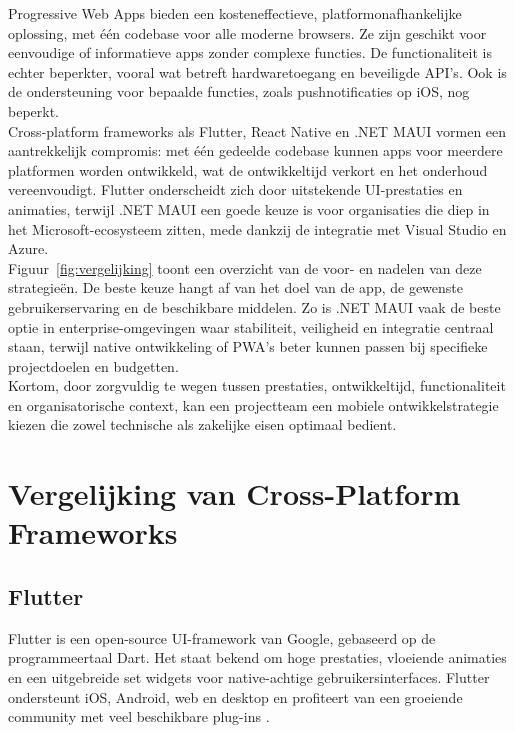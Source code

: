 Progressive Web Apps bieden een kosteneffectieve, platformonafhankelijke oplossing, met één codebase voor alle moderne browsers. Ze zijn geschikt voor eenvoudige of informatieve apps zonder complexe functies. De functionaliteit is echter beperkter, vooral wat betreft hardwaretoegang en beveiligde API’s. Ook is de ondersteuning voor bepaalde functies, zoals pushnotificaties op iOS, nog beperkt.\\

Cross-platform frameworks als Flutter, React Native en .NET MAUI vormen een aantrekkelijk compromis: met één gedeelde codebase kunnen apps voor meerdere platformen worden ontwikkeld, wat de ontwikkeltijd verkort en het onderhoud vereenvoudigt. Flutter onderscheidt zich door uitstekende UI-prestaties en animaties, terwijl .NET MAUI een goede keuze is voor organisaties die diep in het Microsoft-ecosysteem zitten, mede dankzij de integratie met Visual Studio en Azure.\\

Figuur~\ref{fig:vergelijking} toont een overzicht van de voor- en nadelen van deze strategieën. De beste keuze hangt af van het doel van de app, de gewenste gebruikerservaring en de beschikbare middelen. Zo is .NET MAUI vaak de beste optie in enterprise-omgevingen waar stabiliteit, veiligheid en integratie centraal staan, terwijl native ontwikkeling of PWA’s beter kunnen passen bij specifieke projectdoelen en budgetten.\\

Kortom, door zorgvuldig te wegen tussen prestaties, ontwikkeltijd, functionaliteit en organisatorische context, kan een projectteam een mobiele ontwikkelstrategie kiezen die zowel technische als zakelijke eisen optimaal bedient.

\section{Vergelijking van Cross-Platform Frameworks}

\subsection{Flutter}
Flutter is een open-source UI-framework van Google, gebaseerd op de programmeertaal Dart. Het staat bekend om hoge prestaties, vloeiende animaties en een uitgebreide set widgets voor native-achtige gebruikersinterfaces. Flutter ondersteunt iOS, Android, web en desktop en profiteert van een groeiende community met veel beschikbare plug-ins \autocite{Gajjam2025}.\\

